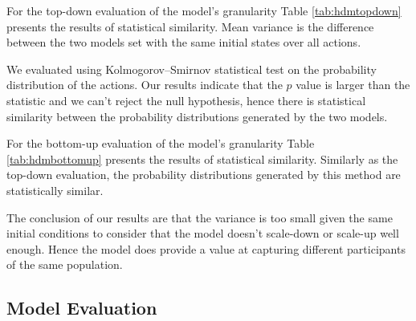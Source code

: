 {For the top-down evaluation of the model's granularity Table \ref{tab:hdmtopdown} presents the results of statistical similarity. Mean variance is the difference between the two models set with the same initial states over all actions. 

We evaluated using Kolmogorov–Smirnov statistical test on the probability distribution of the actions. Our results indicate that the $p$ value is larger than the statistic and we can't reject the null hypothesis, hence there is statistical similarity between the probability distributions generated by the two models. 


For the bottom-up evaluation of the model's granularity Table \ref{tab:hdmbottomup} presents the results of statistical similarity. Similarly as the top-down evaluation, the probability distributions generated by this method are statistically similar.

The conclusion of our results are that the variance is too small given the same initial conditions to consider that the model doesn't scale-down or scale-up well enough. Hence the model does provide a value at capturing different participants of the same population. 


\subsection{Model Evaluation}\label{sec:evaluation}

\begin{figure}[t!]
	\centering 
	

\end{figure}}
